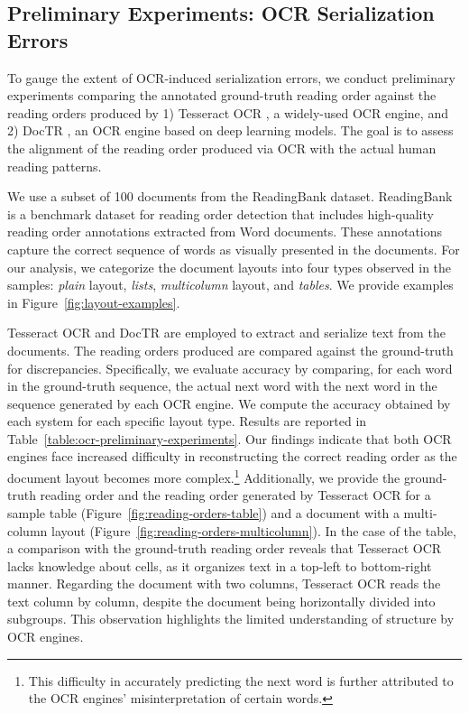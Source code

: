\subsection{Preliminary Experiments: OCR Serialization Errors}

To gauge the extent of \ac{OCR}-induced serialization errors, we conduct preliminary experiments comparing the annotated ground-truth reading order against the reading orders produced by 1) Tesseract OCR \citep{kay2007tesseract}, a widely-used \ac{OCR} engine, and 2) DocTR \citep{doctr2021}, an \ac{OCR} engine based on deep learning models. The goal is to assess the alignment of the reading order produced via \ac{OCR} with the actual human reading patterns.

We use a subset of 100 documents from the ReadingBank \citep{wang2021layoutreader} dataset. ReadingBank is a benchmark dataset for reading order detection that includes high-quality reading order annotations extracted from Word documents. These annotations capture the correct sequence of words as visually presented in the documents. For our analysis, we categorize the document layouts into four types observed in the samples: \textit{plain} layout, \textit{lists}, \textit{multicolumn} layout, and \textit{tables}. We provide examples in Figure~\ref{fig:layout-examples}.

Tesseract OCR and DocTR are employed to extract and serialize text from the documents. The reading orders produced are compared against the ground-truth for discrepancies. Specifically, we evaluate accuracy by comparing, for each word in the ground-truth sequence, the actual next word with the next word in the sequence generated by each \ac{OCR} engine. We compute the accuracy obtained by each system for each specific layout type. Results are reported in Table~\ref{table:ocr-preliminary-experiments}. Our findings indicate that both \ac{OCR} engines face increased difficulty in reconstructing the correct reading order as the document layout becomes more complex.\footnote{This difficulty in accurately predicting the next word is further attributed to the \ac{OCR} engines' misinterpretation of certain words.} Additionally, we provide the ground-truth reading order and the reading order generated by Tesseract OCR for a sample table (Figure~\ref{fig:reading-orders-table}) and a document with a multi-column layout (Figure~\ref{fig:reading-orders-multicolumn}). In the case of the table, a comparison with the ground-truth reading order reveals that Tesseract OCR lacks knowledge about cells, as it organizes text in a top-left to bottom-right manner. Regarding the document with two columns, Tesseract OCR reads the text column by column, despite the document being horizontally divided into subgroups. This observation highlights the limited understanding of structure by \ac{OCR} engines. 

